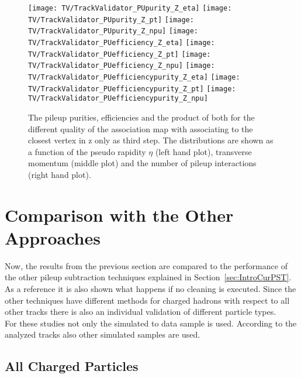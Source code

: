 \clearpage{}


\begin{figure}[!t]
  \centering
  \texttt{[image: TV/TrackValidator\_PUpurity\_Z\_eta]}
  \texttt{[image: TV/TrackValidator\_PUpurity\_Z\_pt]}
  \texttt{[image: TV/TrackValidator\_PUpurity\_Z\_npu]}
  \newline
  \texttt{[image: TV/TrackValidator\_PUefficiency\_Z\_eta]}
  \texttt{[image: TV/TrackValidator\_PUefficiency\_Z\_pt]}
  \texttt{[image: TV/TrackValidator\_PUefficiency\_Z\_npu]}
  \newline
  \texttt{[image: TV/TrackValidator\_PUefficiencypurity\_Z\_eta]}
  \texttt{[image: TV/TrackValidator\_PUefficiencypurity\_Z\_pt]}
  \texttt{[image: TV/TrackValidator\_PUefficiencypurity\_Z\_npu]}
  \caption[Pileup purities, efficiencies and their product for the different quality of the association map with associating to the closest vertex in z only as third step]{The pileup purities, efficiencies and the product of both for the different quality of the association map with associating to the closest vertex in z only as third step. The distributions are shown as a function of the pseudo rapidity $\eta$ (left hand plot), transverse momentum (middle plot) and the number of pileup interactions (right hand plot). \label{plot:TASEFRDQZPileup}}
\end{figure}

\clearpage{}

\section{Comparison with the Other Approaches \label{sec:TASEFRDA}}

Now, the results from the previous section are compared to the performance of the other pileup subtraction techniques explained in Section~\ref{sec:IntroCurPST}. As a reference it is also shown what happens if no cleaning is executed. Since the other techniques have different methods for charged hadrons with respect to all other tracks there is also an individual validation of different particle types. \\
For these studies not only the simulated \Zz to \MM data sample is used. According to the analyzed tracks also other simulated samples are used.

\subsection{All Charged Particles \label{sec:TASEFRDACP}}

